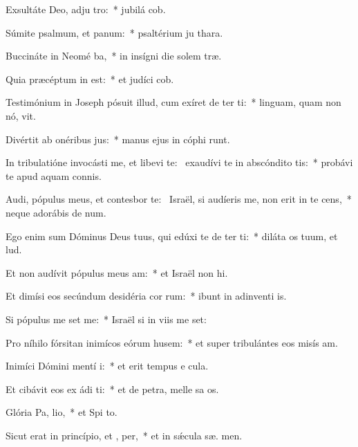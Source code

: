 \item Exsultáte Deo, adju tro:~* jubilá  cob.
\item Súmite psalmum, et  panum:~* psaltérium ju  thara.
\item Buccináte in Neomé ba,~* in insígni die solem træ.
\item Quia præcéptum in  est:~* et judíci  cob.
\item Testimónium in Joseph pósuit illud, cum exíret de ter ti:~* linguam, quam non nó, vit.
\item Divértit ab onéribus  jus:~* manus ejus in cóphi runt.
\item In tribulatióne invocásti me, et libevi te:~\pscross{} exaudívi te in abscóndito tis:~* probávi te apud aquam connis.
\item Audi, pópulus meus, et contesbor te:~\pscross{} Israël, si audíeris me, non erit in te  cens,~* neque adorábis de num.
\item Ego enim sum Dóminus Deus tuus, qui edúxi te de ter ti:~* diláta os tuum, et  lud.
\item Et non audívit pópulus meus  am:~* et Israël non  hi.
\item Et dimísi eos secúndum desidéria cor rum:~* ibunt in adinventi is.
\item Si pópulus me set me:~* Israël si in viis me set:
\item Pro níhilo fórsitan inimícos eórum husem:~* et super tribulántes eos misís  am.
\item Inimíci Dómini mentí  i:~* et erit tempus e  cula.
\item Et cibávit eos ex ádi ti:~* et de petra, melle sa os.
\item Glória Pa,  lio,~* et Spi to.
\item Sicut erat in princípio, et ,  per,~* et in sǽcula sæ. men.
